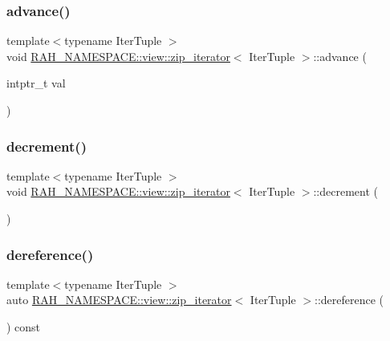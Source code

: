 \subsubsection{\texorpdfstring{advance()}{advance()}}
{\footnotesize\ttfamily template$<$typename Iter\+Tuple $>$ \\
void \mbox{\hyperlink{struct_r_a_h___n_a_m_e_s_p_a_c_e_1_1view_1_1zip__iterator}{R\+A\+H\+\_\+\+N\+A\+M\+E\+S\+P\+A\+C\+E\+::view\+::zip\+\_\+iterator}}$<$ Iter\+Tuple $>$\+::advance (\begin{DoxyParamCaption}\item[{intptr\+\_\+t}]{val }\end{DoxyParamCaption})\hspace{0.3cm}{\ttfamily [inline]}}

\mbox{\label{struct_r_a_h___n_a_m_e_s_p_a_c_e_1_1view_1_1zip__iterator_a27ebf75ef17d162183b3377414d9e091}} 
\subsubsection{\texorpdfstring{decrement()}{decrement()}}
{\footnotesize\ttfamily template$<$typename Iter\+Tuple $>$ \\
void \mbox{\hyperlink{struct_r_a_h___n_a_m_e_s_p_a_c_e_1_1view_1_1zip__iterator}{R\+A\+H\+\_\+\+N\+A\+M\+E\+S\+P\+A\+C\+E\+::view\+::zip\+\_\+iterator}}$<$ Iter\+Tuple $>$\+::decrement (\begin{DoxyParamCaption}{ }\end{DoxyParamCaption})\hspace{0.3cm}{\ttfamily [inline]}}

\mbox{\label{struct_r_a_h___n_a_m_e_s_p_a_c_e_1_1view_1_1zip__iterator_aaee77b971b67b773fd30954887327d92}} 
\subsubsection{\texorpdfstring{dereference()}{dereference()}}
{\footnotesize\ttfamily template$<$typename Iter\+Tuple $>$ \\
auto \mbox{\hyperlink{struct_r_a_h___n_a_m_e_s_p_a_c_e_1_1view_1_1zip__iterator}{R\+A\+H\+\_\+\+N\+A\+M\+E\+S\+P\+A\+C\+E\+::view\+::zip\+\_\+iterator}}$<$ Iter\+Tuple $>$\+::dereference (\begin{DoxyParamCaption}{ }\end{DoxyParamCaption}) const\hspace{0.3cm}{\ttfamily [inline]}}

